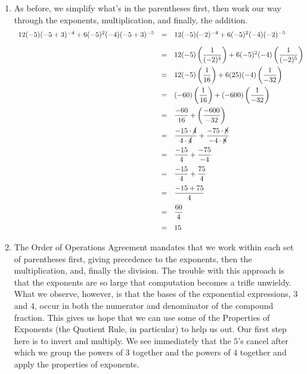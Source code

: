 \begin{ex}
\begin{enumerate}
\item  As before, we simplify what's in the parentheses first, then work our way through the exponents, multiplication, and finally, the addition.\[ \begin{array}{rclr}

12(-5)(-5+3)^{-4}+6(-5)^2(-4)(-5+3)^{-5} & = & 12(-5)(-2)^{-4} + 6(-5)^{2}(-4)(-2)^{-5} \\ [10pt]
                                         & = & 12(-5)\left(\dfrac{1}{(-2)^4}\right) + 6(-5)^{2}(-4)\left(\dfrac{1}{(-2)^5}\right)& \\ [10pt]
                                        
                                         & = & 12(-5)\left(\dfrac{1}{16}\right) + 6(25)(-4)\left(\dfrac{1}{-32}\right)& \\ [10pt]
																				
																				& = & (-60)\left(\dfrac{1}{16}\right) + (-600)\left(\dfrac{1}{-32}\right)& \\ [10pt]

	& = & \dfrac{-60}{16} + \left(\dfrac{-600}{-32}\right)&  \\ [10pt]
		& = & \dfrac{-15\cdot \cancel{4}}{4 \cdot \cancel{4}} + \dfrac{-75 \cdot \cancel{8}}{-4 \cdot \cancel{8}} & \\ [10pt]
		& = & \dfrac{-15}{4} + \dfrac{-75}{-4} & \\ [10pt]
			& = & \dfrac{-15}{4} + \dfrac{75}{4} & \\ [10pt]
				& = & \dfrac{-15 + 75}{4} & \\ [10pt]
				& = & \dfrac{60}{4} & \\ [10pt]
	       & = & 15 & \\  \end{array}\]
				
\item  The Order of Operations Agreement mandates that we work within each set of parentheses first, giving precedence to the exponents, then the multiplication, and, finally the division.  The trouble with this approach is that the exponents are so large that computation becomes a trifle unwieldy.   What we observe, however, is that the bases of the exponential expressions, $3$ and $4$, occur in both the numerator and denominator of the compound fraction.  This gives us hope that we can use some of the Properties of Exponents (the Quotient Rule, in particular) to help us out. Our first step here is to invert and multiply.  We see immediately that the $5$'s cancel after which we group the powers of $3$ together and the powers of $4$ together and apply the properties of exponents.\[ \begin{array}{rclclcl}


\end{array}\]
\end{enumerate}
\end{ex}

